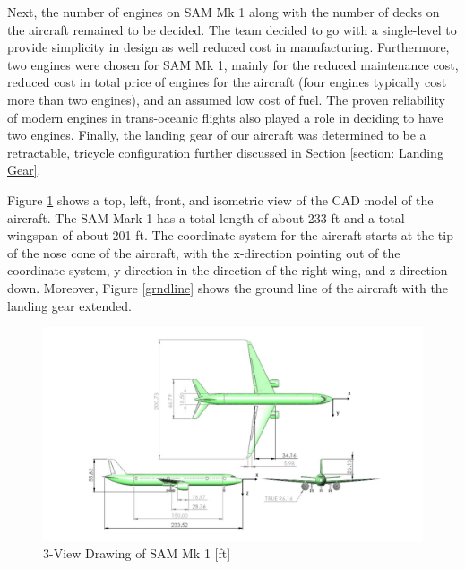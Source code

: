 Next, the number of engines on SAM Mk 1 along with the number of decks on the aircraft remained to be decided. The team decided to go with a single-level to provide simplicity in design as well reduced cost in manufacturing. Furthermore, two engines were chosen for SAM Mk 1, mainly for the reduced maintenance cost, reduced cost in total price of engines for the aircraft (four engines typically cost more than two engines), and an assumed low cost of fuel. The proven reliability of modern engines in trans-oceanic flights also played a role in deciding to have two engines. Finally, the landing gear of our aircraft was determined to be a retractable, tricycle configuration further discussed in Section \ref{section: Landing Gear}. 

Figure \ref{fig:threeview} shows a top, left, front, and isometric view of the CAD model of the aircraft. The SAM Mark 1 has a total length of about 233 ft and a total wingspan of about 201 ft. The coordinate system for the aircraft starts at the tip of the nose cone of the aircraft, with the x-direction pointing out of the coordinate system, y-direction in the direction of the right wing, and z-direction down. Moreover, Figure \ref{grndline} shows the ground line of the aircraft with the landing gear extended.

\begin{figure}[H]
    \centering
    \includegraphics[width=1.16\linewidth, angle =90 ]{Photos/3-view with coords_(4-27-20).pdf}
    \caption{3-View Drawing of SAM Mk 1 [ft]}
    \label{fig:threeview}
\end{figure}
\clearpage

